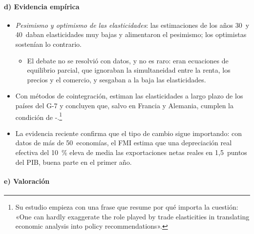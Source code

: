 \documentclass[11pt]{article}
\begin{document}
\paragraph{d) Evidencia empírica}

\begin{itemize}
\item \emph{Pesimismo y optimismo de las elasticidades}: las estimaciones de los años 30~y 40~daban elasticidades muy bajas y alimentaron el pesimismo; los optimistas sostenían lo contrario.
  \begin{itemize}
  \item El debate no se resolvió con datos, y no es raro: eran ecuaciones de equilibrio parcial, que ignoraban la simultaneidad entre la renta, los precios y el comercio, y sesgaban a la baja las elasticidades\nocite{Gandolfo2016International}.
  \end{itemize}
\item Con métodos de cointegración, \textcite{HooperJohnsonMarquez2000} estiman las elasticidades a largo plazo de los países del G-7 y concluyen que, salvo en Francia y Alemania, cumplen la condición de -.\footnote{Su estudio empieza con una frase que resume por qué importa la cuestión: «One can hardly exaggerate the role played by trade elasticities in translating economic analysis into policy recommendations».}
\item La evidencia reciente confirma que el tipo de cambio sigue importando: con datos de más de 50~economías, el FMI estima que una depreciación real efectiva del 10~\% eleva de media las exportaciones netas reales en 1,5~puntos del PIB, buena parte en el primer año\nocite{FMI2015WEOoct}.
\end{itemize}

\paragraph{e) Valoración}
\end{document}

